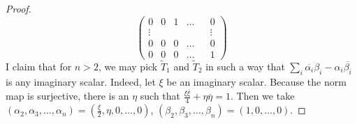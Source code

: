 \documentclass[10pt,a4paper]{amsart}
\begin{document}
\begin{proof}
$$\begin{pmatrix}
			0 & 0 & 1 & \ldots & & 0 \\
			\vdots & & & & & \vdots \\
			0 & 0 & 0 & \ldots & & 0 \\
			0 & 0 & 0 & \ldots & & 1
		\end{pmatrix}$$
		I claim that for $n > 2$, we may pick $\widetilde{T}_1$ and $\widetilde{T}_2$ in such a way that $ \sum_i \overline{\alpha_i}\beta_i - \alpha_i \overline{\beta_i} $ is any imaginary scalar. Indeed, let $\xi$ be an imaginary scalar. Because the norm map is surjective, there is an $\eta$ such that $\frac{\xi \overline{\xi}}{4} + \eta \overline{\eta}=1$. Then we take $(\alpha_2, \alpha_3, \ldots, \alpha_n) = (\frac{\xi}{2}, \eta, 0,\ldots, 0)$, $(\beta_2, \beta_3, \ldots, \beta_n) = (1,0, \ldots, 0)$.
	\end{proof}
\end{document}

